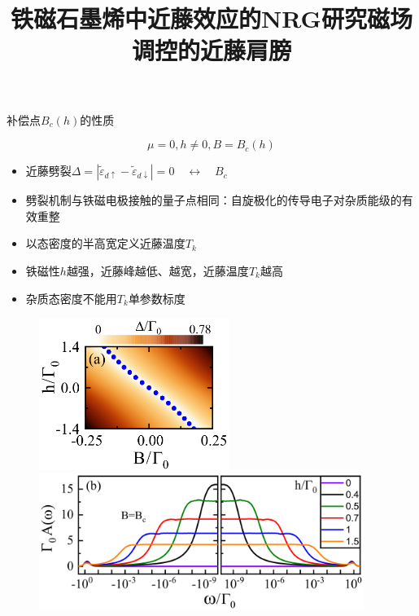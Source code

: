 \documentclass[9pt,t]{beamer} %
\begin{document}
\title{铁磁石墨烯中近藤效应的NRG研究\qquad \qquad \qquad \qquad 磁场调控的近藤肩膀}
\begin{frame}{补偿点$B_{c}(h)$的性质}
\vspace{0.5cm}
\begin{minipage}[t]{0.55 \textwidth}
\[\mu=0, h\neq 0, B=B_{c}(h)\]
\begin{itemize}
\setlength\itemsep{0.5em}
\item 近藤劈裂$\Delta=\left|\widetilde{\varepsilon}_{d \uparrow}-\widetilde{\varepsilon}_{d \downarrow}\right|=0\quad \longleftrightarrow{\quad }B_{c}$
\item 劈裂机制与铁磁电极接触的量子点相同：自旋极化的传导电子对杂质能级的有效重整
\item 以态密度的半高宽定义近藤温度$T_{k}$
\item 铁磁性$h$越强，近藤峰越低、越宽，近藤温度$T_{k}$越高
\item 杂质态密度不能用$T_{k}$单参数标度
\end{itemize}
\end{minipage}%
\begin{minipage}[t]{0.45 \textwidth}
\vspace{-0.7cm}
\hspace{-1.3cm}
\begin{figure}
\includegraphics[width=0.55\textwidth]{Bc1.png}
\includegraphics[width=0.94\textwidth]{Aw-h-Bc.png}

\end{figure}
\end{minipage}
\end{frame}
\end{document}

